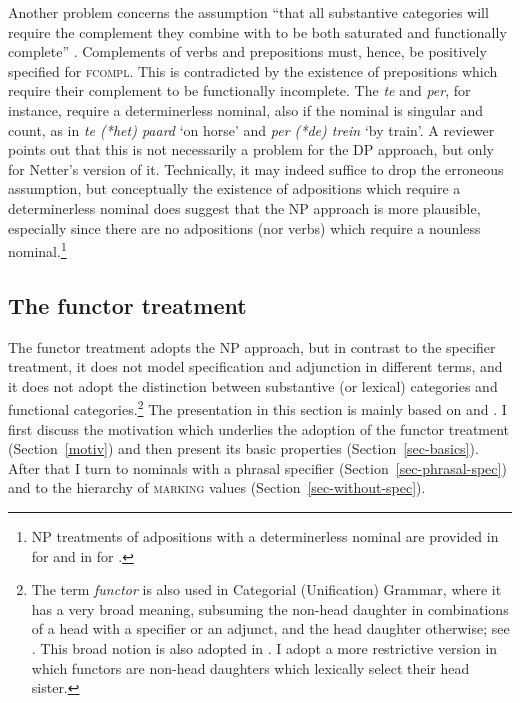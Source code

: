 \documentclass[output=paper
	        ,collection
	        ,collectionchapter
 	        ,biblatex
                ,babelshorthands
                ,newtxmath
                ,draftmode
                ,colorlinks, citecolor=brown
]{langscibook}
\begin{document}
Another problem concerns the assumption ``that all substantive categories will 
require the complement they combine with to be both saturated and functionally complete''
\citep[311]{Netter94}. Complements of verbs and prepositions must, hence, be positively 
specified for \textsc{fcompl}. This is contradicted by the existence of
prepositions which require their complement to be functionally incomplete. 
The  \emph{te} and \emph{per}, for instance, require a determinerless nominal,
also if the nominal is singular and count, as in \emph{te (*het) paard} `on horse' 
and \emph{per (*de) trein} `by train'. A reviewer points out that this is 
not necessarily a problem for the DP approach, but only for Netter's version of it. 
Technically, it may indeed suffice to drop the erroneous assumption, but 
conceptually the existence of adpositions which require a determinerless nominal 
does suggest that the NP approach is more plausible, especially since 
there are no adpositions (nor verbs) which require a nounless nominal.\footnote{NP 
treatments of adpositions with a determinerless nominal are provided in 
\citet{VanEynde04} for  and in \citet{Kiss2008a-u} for .}    


\subsection{The functor treatment} 
\label{funct}


The functor treatment adopts the NP approach, but in contrast to the specifier treatment,  
it does not model specification and adjunction in different terms, and it does not adopt 
the distinction between substantive (or lexical) categories and functional 
categories.\footnote{The term \emph{functor} is also used in Categorial (Unification) Grammar, 
where it has a very broad meaning, subsuming the non-head daughter in combinations of a 
head with a specifier or an adjunct, and the head daughter otherwise;
see \citet{Bouma88}. This broad notion is also adopted in 
\citet{Reape94}. I adopt a more restrictive version in which functors 
are non-head daughters which lexically select their head sister.}  
The presentation in this section is mainly based on \citet{VanEynde06} 
and \citet{Allegranza06}. I first discuss the motivation which underlies the adoption 
of the functor treatment (Section~\ref{motiv}) and then present its basic
properties (Section~\ref{sec-basics}). After that I turn to nominals with a 
phrasal specifier (Section~\ref{sec-phrasal-spec}) 
and to the hierarchy of \textsc{marking} values (Section~\ref{sec-without-spec}).    
\end{document}
